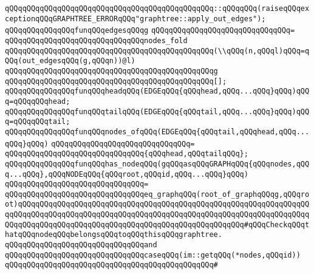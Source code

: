 \verb|qQQqqQQqqQQqqQQqqQQqqQQqqQQqqQQqqQQqqQQqqQQqqQQq::qQQqqQQq(raiseqQQqexceptionqQQqGRAPHTREE_ERRORqQQq"graphtree::apply_out_edges");|\newline
\newline
\verb|qQQqqQQqqQQqqQQqfunqQQqedgesqQQqg|\newline
\verb|qQQqqQQqqQQqqQQqqQQqqQQqqQQqqQQq=|\newline
\verb|qQQqqQQqqQQqqQQqqQQqqQQqqQQqqQQqnodes_fold|\newline
\verb|qQQqqQQqqQQqqQQqqQQqqQQqqQQqqQQqqQQqqQQqqQQqqQQq(\\qQQq(n,qQQql)qQQq=qQQq(out_edgesqQQq(g,qQQqn))@l)|\newline
\verb|qQQqqQQqqQQqqQQqqQQqqQQqqQQqqQQqqQQqqQQqqQQqqQQqg|\newline
\verb|qQQqqQQqqQQqqQQqqQQqqQQqqQQqqQQqqQQqqQQqqQQqqQQq[];|\newline
\newline
\verb|qQQqqQQqqQQqqQQqfunqQQqheadqQQq(EDGEqQQq{qQQqhead,qQQq...qQQq}qQQq)qQQq=qQQqqQQqhead;|\newline
\verb|qQQqqQQqqQQqqQQqfunqQQqtailqQQq(EDGEqQQq{qQQqtail,qQQq...qQQq}qQQq)qQQq=qQQqqQQqtail;|\newline
\newline
\verb|qQQqqQQqqQQqqQQqfunqQQqnodes_ofqQQq(EDGEqQQq{qQQqtail,qQQqhead,qQQq...qQQq}qQQq)|\newline
\verb|qQQqqQQqqQQqqQQqqQQqqQQqqQQqqQQq=|\newline
\verb|qQQqqQQqqQQqqQQqqQQqqQQqqQQqqQQq{qQQqhead,qQQqtailqQQq};|\newline
\newline
\verb|qQQqqQQqqQQqqQQqfunqQQqhas_nodeqQQq(gqQQqasqQQqGRAPHqQQq{qQQqnodes,qQQq...qQQq},qQQqNODEqQQq{qQQqroot,qQQqid,qQQq...qQQq}qQQq)|\newline
\verb|qQQqqQQqqQQqqQQqqQQqqQQqqQQqqQQq=|\newline
\verb|qQQqqQQqqQQqqQQqqQQqqQQqqQQqqQQqeq_graphqQQq(root_of_graphqQQqg,qQQqroot)qQQqqQQqqQQqqQQqqQQqqQQqqQQqqQQqqQQqqQQqqQQqqQQqqQQqqQQqqQQqqQQqqQQqqQQqqQQqqQQqqQQqqQQqqQQqqQQqqQQqqQQqqQQqqQQqqQQqqQQqqQQqqQQqqQQqqQQqqQQqqQQqqQQqqQQqqQQqqQQqqQQqqQQqqQQqqQQqqQQqqQQqqQQqqQQq#qQQqCheckqQQqthatqQQqnodeqQQqbelongsqQQqtoqQQqthisqQQqgraphtree.|\newline
\verb|qQQqqQQqqQQqqQQqqQQqqQQqqQQqqQQqand|\newline
\verb|qQQqqQQqqQQqqQQqqQQqqQQqqQQqqQQqcaseqQQq(im::getqQQq(*nodes,qQQqid))|\newline
\verb|qQQqqQQqqQQqqQQqqQQqqQQqqQQqqQQqqQQqqQQqqQQqqQQq#|\newline

